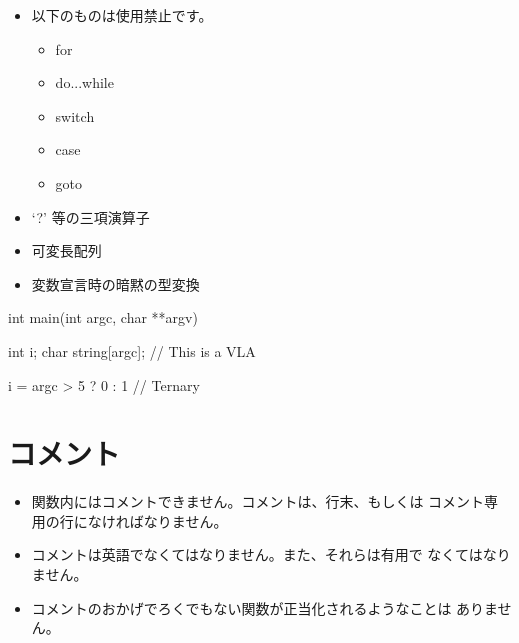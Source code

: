 \documentclass{42-ja}
\begin{document}
        \begin{itemize}

            \item 以下のものは使用禁止です。

                \begin{itemize}

                    \item for
                    \item do...while
                    \item switch
                    \item case
                    \item goto

                \end{itemize}

            \item `?' 等の三項演算子

            \item 可変長配列

            \item 変数宣言時の暗黙の型変換

        \end{itemize}
        \begin{42ccode}
    int main(int argc, char **argv)
    {
        int     i;
        char    string[argc]; // This is a VLA

        i = argc > 5 ? 0 : 1 // Ternary
    }
        \end{42ccode}
        \newpage

    \section{コメント}

        \begin{itemize}

            \item 関数内にはコメントできません。コメントは、行末、もしくは
				コメント専用の行になければなりません。

            \item コメントは英語でなくてはなりません。また、それらは有用で
				なくてはなりません。

            \item コメントのおかげでろくでもない関数が正当化されるようなことは
				ありません。

        \end{itemize}
        \newpage
\end{document}
